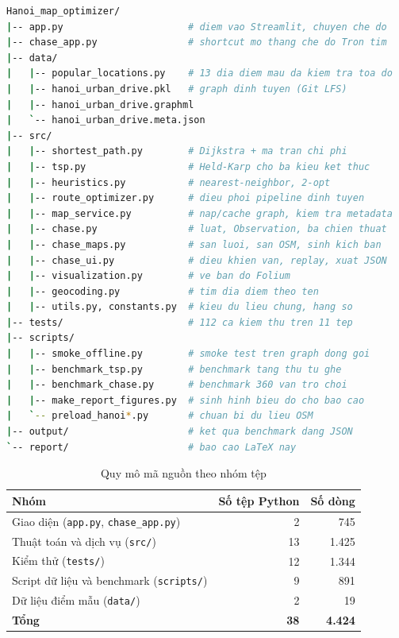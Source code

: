 \begin{lstlisting}[language=bash,caption={Cây thư mục dự án (bỏ qua tệp sinh ra)}]
Hanoi_map_optimizer/
|-- app.py                      # diem vao Streamlit, chuyen che do
|-- chase_app.py                # shortcut mo thang che do Tron tim
|-- data/
|   |-- popular_locations.py    # 13 dia diem mau da kiem tra toa do
|   |-- hanoi_urban_drive.pkl   # graph dinh tuyen (Git LFS)
|   |-- hanoi_urban_drive.graphml
|   `-- hanoi_urban_drive.meta.json
|-- src/
|   |-- shortest_path.py        # Dijkstra + ma tran chi phi
|   |-- tsp.py                  # Held-Karp cho ba kieu ket thuc
|   |-- heuristics.py           # nearest-neighbor, 2-opt
|   |-- route_optimizer.py      # dieu phoi pipeline dinh tuyen
|   |-- map_service.py          # nap/cache graph, kiem tra metadata
|   |-- chase.py                # luat, Observation, ba chien thuat
|   |-- chase_maps.py           # san luoi, san OSM, sinh kich ban
|   |-- chase_ui.py             # dieu khien van, replay, xuat JSON
|   |-- visualization.py        # ve ban do Folium
|   |-- geocoding.py            # tim dia diem theo ten
|   |-- utils.py, constants.py  # kieu du lieu chung, hang so
|-- tests/                      # 112 ca kiem thu tren 11 tep
|-- scripts/
|   |-- smoke_offline.py        # smoke test tren graph dong goi
|   |-- benchmark_tsp.py        # benchmark tang thu tu ghe
|   |-- benchmark_chase.py      # benchmark 360 van tro choi
|   |-- make_report_figures.py  # sinh hinh bieu do cho bao cao
|   `-- preload_hanoi*.py       # chuan bi du lieu OSM
|-- output/                     # ket qua benchmark dang JSON
`-- report/                     # bao cao LaTeX nay
\end{lstlisting}

\begin{table}[H]
\centering
\caption{Quy mô mã nguồn theo nhóm tệp}
\label{tab:quy-mo-ma}
\begin{tabular}{l r r}
\toprule
\textbf{Nhóm} & \textbf{Số tệp Python} & \textbf{Số dòng} \\
\midrule
Giao diện (\texttt{app.py}, \texttt{chase\_app.py}) & 2 & 745 \\
Thuật toán và dịch vụ (\texttt{src/}) & 13 & 1.425 \\
Kiểm thử (\texttt{tests/}) & 12 & 1.344 \\
Script dữ liệu và benchmark (\texttt{scripts/}) & 9 & 891 \\
Dữ liệu điểm mẫu (\texttt{data/}) & 2 & 19 \\
\midrule
\textbf{Tổng} & \textbf{38} & \textbf{4.424} \\
\bottomrule
\end{tabular}
\end{table}

